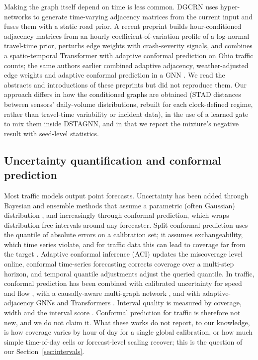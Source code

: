 \documentclass[conference]{IEEEtran}
\begin{document}
Making the graph itself depend on time is less common. DGCRN \cite{li2023dgcrn} uses hyper-networks to generate time-varying adjacency matrices from the current input and fuses them with a static road prior. A recent preprint \cite{patil2026} builds hour-conditioned adjacency matrices from an hourly coefficient-of-variation profile of a log-normal travel-time prior, perturbs edge weights with crash-severity signals, and combines a spatio-temporal Transformer with adaptive conformal prediction on Ohio traffic counts; the same authors earlier combined adaptive adjacency, weather-adjusted edge weights and adaptive conformal prediction in a GNN \cite{patil2025}. We read the abstracts and introductions of these preprints but did not reproduce them. Our approach differs in how the conditioned graphs are obtained (STAD distances between sensors' daily-volume distributions, rebuilt for each clock-defined regime, rather than travel-time variability or incident data), in the use of a learned gate to mix them inside DSTAGNN, and in that we report the mixture's negative result with seed-level statistics.

\subsection{Uncertainty quantification and conformal prediction}\label{sec:ls-d}
Most traffic models output point forecasts. Uncertainty has been added through Bayesian and ensemble methods that assume a parametric (often Gaussian) distribution \cite{qian2024uq}, and increasingly through conformal prediction, which wraps distribution-free intervals around any forecaster. Split conformal prediction \cite{lei2018} uses the quantile of absolute errors on a calibration set; it assumes exchangeability, which time series violate, and for traffic data this can lead to coverage far from the target \cite{dong2024castmgcn}. Adaptive conformal inference (ACI) \cite{gibbs2021aci} updates the miscoverage level online, conformal time-series forecasting \cite{stankeviciute2021cfrnn} corrects coverage over a multi-step horizon, and temporal quantile adjustments \cite{lin2022tqa} adjust the queried quantile. In traffic, conformal prediction has been combined with calibrated uncertainty for speed and flow \cite{wu2024adaptive}, with a causally-aware multi-graph network \cite{dong2024castmgcn}, and with adaptive-adjacency GNNs and Transformers \cite{patil2025,patil2026}. Interval quality is measured by coverage, width and the interval score \cite{gneiting2007}. Conformal prediction for traffic is therefore not new, and we do not claim it. What these works do not report, to our knowledge, is how coverage varies by hour of day for a single global calibration, or how much simple time-of-day cells or forecast-level scaling recover; this is the question of our Section~\ref{sec:intervals}.
\end{document}
